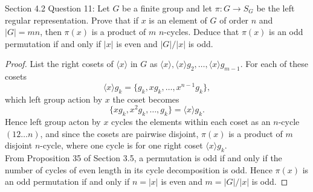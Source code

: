 Section 4.2 Question 11:
Let $G$ be a finite group and let $\pi:G\rightarrow S_G$ be the left
regular representation. Prove that if $x$ is an element of $G$ of order $n$
and $|G|=mn$, then $\pi(x)$ is a product of $m$ $n$-cycles. Deduce that
$\pi(x)$ is an odd permutation if and only if $|x|$ is even and $|G|/|x|$
is odd.

\begin{proof}
  List the right cosets of $\langle x\rangle$ in $G$ as $\langle
  x\rangle,\langle x\rangle g_2,\ldots,\langle x\rangle g_{m-1}$. For
  each of these cosets
  \begin{equation*}
    \langle x\rangle g_{k} = \{g_k,xg_k,\ldots,x^{n-1}g_k\},
  \end{equation*}
  which left group action by $x$ the coset becomes
  \begin{equation*}
    \{xg_k,x^2g_k,\ldots,g_k\} = \langle x\rangle g_{k}.
  \end{equation*}
  Hence left group acton by $x$ cycles the elements within each coset as an
  $n$-cycle $(12\ldots n)$, and since the cosets are pairwise disjoint,
  $\pi(x)$ is a product of $m$ disjoint $n$-cycle, where one cycle is for one
  right coset $\langle x\rangle g_{k}$. \\

  From Proposition 35 of Section 3.5, a permutation is odd if and only if
  the number of cycles of even length in its cycle decomposition is odd.
  Hence $\pi(x)$ is an odd permutation if and only if $n=|x|$ is even and
  $m=|G|/|x|$ is odd.
\end{proof}
